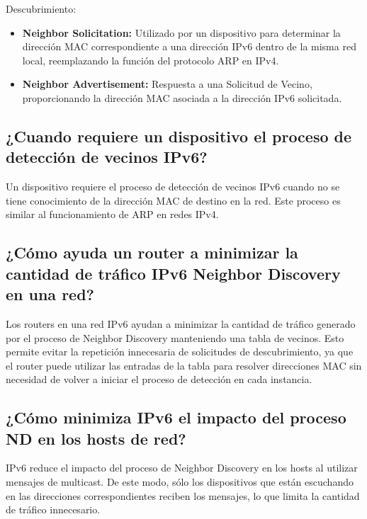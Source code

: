 \documentclass[a4paper,12pt]{article}
\begin{document}
\bigskip

Descubrimiento:\\
  \begin{itemize}
    \item {\textbf{Neighbor Solicitation:} Utilizado por un dispositivo para determinar la dirección MAC correspondiente a una dirección IPv6 dentro de la misma red local, reemplazando la función del protocolo ARP en IPv4. }
    \item {\textbf{Neighbor Advertisement:} Respuesta a una Solicitud de Vecino, proporcionando la dirección MAC asociada a la dirección IPv6 solicitada.}
  \end{itemize}

\subsection{¿Cuando requiere un dispositivo el proceso de detección de vecinos IPv6? }

Un dispositivo requiere el proceso de detección de vecinos IPv6 cuando no se tiene conocimiento de la dirección MAC de destino en la red. Este proceso es similar al funcionamiento de ARP en redes IPv4.\\

\subsection{¿Cómo ayuda un router a minimizar la cantidad de tráfico IPv6 Neighbor Discovery en una red? }

Los routers en una red IPv6 ayudan a minimizar la cantidad de tráfico generado por el proceso de Neighbor Discovery manteniendo una tabla de vecinos. Esto permite evitar la repetición innecesaria de solicitudes de descubrimiento, ya que el router puede utilizar las entradas de la tabla para resolver direcciones MAC sin necesidad de volver a iniciar el proceso de detección en cada instancia.\\

\subsection{¿Cómo minimiza IPv6 el impacto del proceso ND en los hosts de red? }

IPv6 reduce el impacto del proceso de Neighbor Discovery en los hosts al utilizar mensajes de multicast. De este modo, sólo los dispositivos que están escuchando en las direcciones correspondientes reciben los mensajes, lo que limita la cantidad de tráfico innecesario.\\
\end{document}

